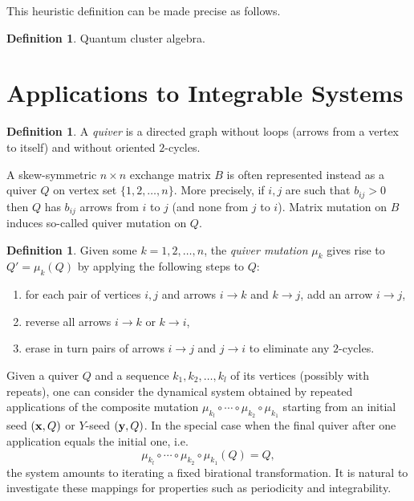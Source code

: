 \documentclass{amsart}
\theoremstyle{definition}
\newtheorem{definition}[theorem]{Definition}
\theoremstyle{remark}
\numberwithin{equation}{section}
\newcommand{\x}{{\bf x}}
\newcommand{\y}{{\bf y}}
\begin{document}
  This heuristic definition can be made precise as follows.
  \begin{definition}
    Quantum cluster algebra.
  \end{definition}

\section{Applications to Integrable Systems}\label{sec:integrable_systems}
	\begin{definition}
		A \emph{quiver} is a directed graph without loops (arrows from a vertex to itself) and without oriented $2$-cycles.
	\end{definition}
	
	A skew-symmetric $n\times n$ exchange matrix $B$ is often represented instead as a quiver $Q$ on vertex set $\{1,2,\ldots, n\}$.  More precisely, if $i,j$ are such that $b_{ij}>0$ then $Q$ has $b_{ij}$ arrows from $i$ to $j$ (and none from $j$ to $i$).  Matrix mutation on $B$ induces so-called quiver mutation on $Q$.
	
	\begin{definition}
		Given some $k=1,2,\ldots, n$, the \emph{quiver mutation} $\mu_k$ gives rise to $Q' = \mu_k(Q)$ by applying the following steps to $Q$:
		\begin{enumerate}
		\item for each pair of vertices $i,j$ and arrows $i\to k$ and $k \to j$, add an arrow $i \to j$,
		\item reverse all arrows $i \to k$ or $k \to i$,
		\item erase in turn pairs of arrows $i \to j$ and $j \to i$ to eliminate any $2$-cycles.
		\end{enumerate}
	\end{definition}
	
	Given a quiver $Q$ and a sequence $k_1,k_2,\ldots, k_l$ of its vertices (possibly with repeats), one can consider the dynamical system obtained by repeated applications of the composite mutation $\mu_{k_l} \circ \cdots \circ \mu_{k_2} \circ \mu_{k_1}$ starting from an initial seed $(\x, Q)$ or $Y$-seed $(\y,Q)$.  In the special case when the final quiver after one application equals the initial one, i.e.
	\begin{displaymath}
		\mu_{k_l} \circ \cdots \circ \mu_{k_2} \circ \mu_{k_1}(Q) = Q,
	\end{displaymath}
	the system amounts to iterating a fixed birational transformation.  It is natural to investigate these mappings for properties such as periodicity and integrability.
\end{document}
